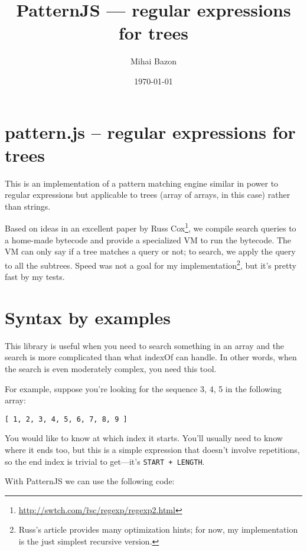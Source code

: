 \documentclass[a4paper,10pt]{article}
\title{PatternJS — regular expressions for trees}
\author{Mihai Bazon}
\date{\today}
\begin{document}
\maketitle

\setcounter{tocdepth}{3}
\tableofcontents
\vspace*{1cm}

\section{pattern.js -- regular expressions for trees}
\label{sec-1}


This is an implementation of a pattern matching engine similar in power to
regular expressions but applicable to trees (array of arrays, in this case)
rather than strings.

Based on ideas in an excellent paper by Russ Cox\footnote{\href{http://swtch.com/~rsc/regexp/regexp2.html}{http://swtch.com/\~rsc/regexp/regexp2.html} }, we compile search
queries to a home-made bytecode and provide a specialized VM to run the
bytecode.  The VM can only say if a tree matches a query or not; to search,
we apply the query to all the subtrees.  Speed was not a goal for my
implementation\footnote{Russ's article provides many optimization hints; for now, my
implementation is the just simplest recursive version. }, but it's pretty fast by my tests.
\section{Syntax by examples}
\label{sec-2}


This library is useful when you need to search something in an array and the
search is more complicated than what indexOf can handle.  In other words,
when the search is even moderately complex, you need this tool.

For example, suppose you're looking for the sequence 3, 4, 5 in the
following array:


\begin{verbatim}
[ 1, 2, 3, 4, 5, 6, 7, 8, 9 ]
\end{verbatim}

You would like to know at which index it starts.  You'll usually need to
know where it ends too, but this is a simple expression that doesn't involve
repetitions, so the end index is trivial to get—it's \texttt{START + LENGTH}.

With PatternJS we can use the following code:
\end{document}
